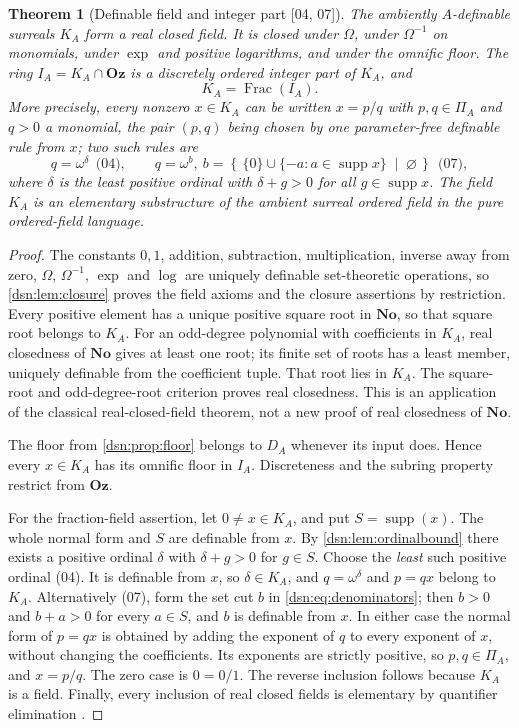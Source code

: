 \documentclass[11pt,a4paper]{article}
\numberwithin{equation}{section}
\newtheorem{theorem}{Theorem}[section]
\theoremstyle{definition}
\theoremstyle{remark}
\newcommand{\No}{\mathbf{No}}
\newcommand{\Oz}{\mathbf{Oz}}
\newcommand{\supp}{\operatorname{supp}}
\newcommand{\Frac}{\operatorname{Frac}}
\newcommand{\cut}[2]{\left\{\,#1\;\middle|\;#2\,\right\}}
\newcommand{\src}[1]{\textup{\textsf{\small[#1]}}}
\begin{document}
\begin{theorem}[Definable field and integer part \src{04, 07}]\label{dsn:thm:hull}
The ambiently $A$-definable surreals $K_A$ form a real closed field. It is
closed under $\Omega$, under $\Omega^{-1}$ on monomials, under $\exp$ and
positive logarithms, and under the omnific floor. The ring $I_A=K_A\cap\Oz$
is a discretely ordered integer part of $K_A$, and
\begin{equation}\label{dsn:eq:frac}
 K_A=\Frac(I_A).
\end{equation}
More precisely, every nonzero $x\in K_A$ can be written $x=p/q$ with
$p,q\in\Pi_A$ and $q>0$ a monomial, the pair $(p,q)$ being chosen by one
parameter-free definable rule from $x$; two such rules are
\begin{equation}\label{dsn:eq:denominators}
 q=\omega^{\delta}\ \ \text{(04)},\qquad
 q=\omega^{b},\ b=\cut{\{0\}\cup\{-a:a\in\supp x\}}{\varnothing}\ \ \text{(07)},
\end{equation}
where $\delta$ is the least positive ordinal with $\delta+g>0$ for all
$g\in\supp x$. The field $K_A$ is an elementary substructure of the ambient
surreal ordered field in the pure ordered-field language.
\end{theorem}
\begin{proof}
The constants $0,1$, addition, subtraction, multiplication, inverse away
from zero, $\Omega$, $\Omega^{-1}$, $\exp$ and $\log$ are uniquely definable
set-theoretic operations, so \cref{dsn:lem:closure} proves the field
axioms and the closure assertions by restriction. Every positive element
has a unique positive square root in $\No$, so that square root belongs to
$K_A$. For an odd-degree polynomial with coefficients in $K_A$, real
closedness of $\No$ gives at least one root; its finite set of roots has a
least member, uniquely definable from the coefficient tuple. That root lies
in $K_A$. The square-root and odd-degree-root criterion proves real
closedness. This is an application of the classical real-closed-field
theorem, not a new proof of real closedness of $\No$.

The floor from \cref{dsn:prop:floor} belongs to $D_A$ whenever its input
does. Hence every $x\in K_A$ has its omnific floor in $I_A$. Discreteness
and the subring property restrict from $\Oz$.

For the fraction-field assertion, let $0\ne x\in K_A$, and put
$S=\supp(x)$. The whole normal form and $S$ are definable from $x$.
By \cref{dsn:lem:ordinalbound} there exists a positive ordinal $\delta$
with $\delta+g>0$ for $g\in S$. Choose the \emph{least} such positive
ordinal (04). It is definable from $x$, so $\delta\in K_A$, and
$q=\omega^\delta$ and $p=qx$ belong to $K_A$. Alternatively (07), form the
set cut $b$ in \eqref{dsn:eq:denominators}; then $b>0$ and $b+a>0$ for
every $a\in S$, and $b$ is definable from $x$. In either case the normal
form of $p=qx$ is obtained by adding the exponent of $q$ to every exponent
of $x$, without changing the coefficients. Its exponents are strictly
positive, so $p,q\in\Pi_A$, and $x=p/q$. The zero case is $0=0/1$. The
reverse inclusion follows because $K_A$ is a field. Finally, every
inclusion of real closed fields is elementary by quantifier elimination
\cite{Marker}.
\end{proof}
\end{document}
